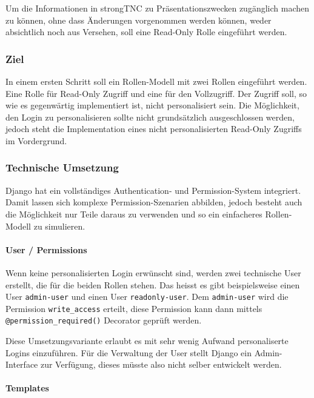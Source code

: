 Um die Informationen in strongTNC zu Präsentationszwecken zugänglich machen zu können, 
ohne dass Änderungen vorgenommen werden können, weder absichtlich noch aus Versehen, 
soll eine Read-Only Rolle eingeführt werden.


\subsubsection{Ziel}

In einem ersten Schritt soll ein Rollen-Modell mit zwei Rollen eingeführt werden. 
Eine Rolle für Read-Only Zugriff und eine für den Vollzugriff. Der Zugriff soll, 
so wie es gegenwärtig implementiert ist, nicht personalisiert sein. Die Möglichkeit, 
den Login zu personalisieren sollte nicht grundsätzlich ausgeschlossen werden, jedoch 
steht die Implementation eines nicht personalisierten Read-Only Zugriffs im Vordergrund.


\subsubsection{Technische Umsetzung}

Django hat ein vollständiges Authentication- und Permission-System integriert. Damit 
lassen sich komplexe Permission-Szenarien abbilden, jedoch besteht auch die Möglichkeit 
nur Teile daraus zu verwenden und so ein einfacheres Rollen-Modell zu simulieren.

\paragraph*{User / Permissions}

Wenn keine personalisierten Login erwünscht sind, werden zwei technische User
erstellt, die für die beiden Rollen stehen. Das heisst es gibt beispielsweise
einen User \texttt{admin-user} und einen User \texttt{readonly-user}. Dem
\texttt{admin-user} wird die Permission \texttt{write\_access} erteilt, diese
Permission kann dann mittels \texttt{@permission\_required()} Decorator geprüft
werden.

Diese Umsetzungsvariante erlaubt es mit sehr wenig Aufwand personaliserte Logins
einzuführen. Für die Verwaltung der User stellt Django ein Admin-Interface zur
Verfügung, dieses müsste also nicht selber entwickelt werden.

\paragraph*{Templates}

